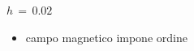 \begin{frame}
\begin{columns}
\begin{column}{0.5\textwidth}
\begin{block}{$h\,=\,0.02$}
                \vspace{0.5cm}
                \begin{itemize}[itemsep=0.5em, label=$\diamond$]
                    \item campo magnetico impone ordine
                \end{itemize}
            
            \end{block}
        \end{column}
    \end{columns}

\end{frame}